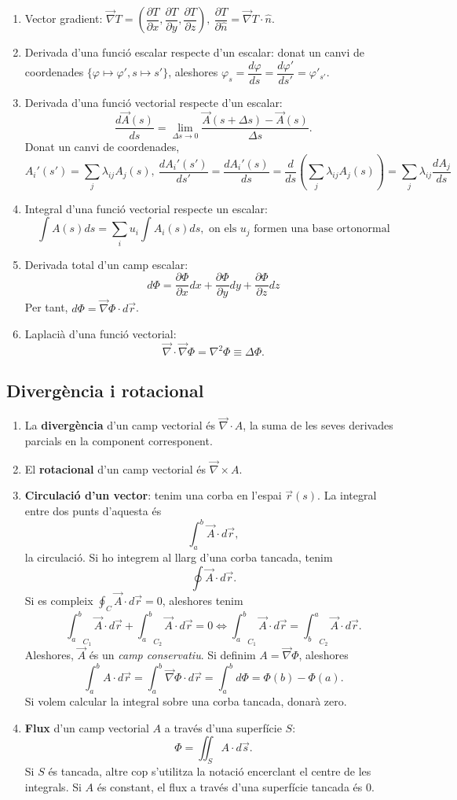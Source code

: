\begin{enumerate}
	\item Vector gradient: $\vec{\nabla}T=\left(\dfrac{\partial T}{\partial x},\dfrac{\partial T}{\partial y},\dfrac{\partial T}{\partial z}\right),\ \dfrac{\partial T}{\partial\hat{n}}=\vec{\nabla}T\cdot\hat{n}$.
	\item Derivada d'una funció escalar respecte d'un escalar: donat un canvi de coordenades $\{\varphi\mapsto\varphi',s\mapsto s'\}$, aleshores $\varphi_s=\dfrac{d\varphi}{ds}=\dfrac{d\varphi'}{ds'}=\varphi'_{s'}$.
	\item Derivada d'una funció vectorial respecte d'un escalar: \[\dfrac{d\vec{A}(s)}{ds}=\lim_{\Delta s\rightarrow0}\dfrac{\vec{A}(s+\Delta s)-\vec{A}(s)}{\Delta s}.\] Donat un canvi de coordenades,
	\[
	A_i'(s')=\sum_j\lambda_{ij}A_j(s),\ \dfrac{dA_i'(s')}{ds'}=\dfrac{dA_i'(s)}{ds}=\dfrac{d}{ds}\left(\sum_{j}\lambda_{ij}A_j(s)\right)=\sum_{j}\lambda_{ij}\dfrac{dA_j}{ds}
	\]
	\item Integral d'una funció vectorial respecte un escalar:
	\[\int A(s)ds=\sum_iu_i\int A_i(s)ds,\text{ on els }u_j\text{ formen una base ortonormal}\]
	\item Derivada total d'un camp escalar:
	\[d\Phi=\dfrac{\partial\Phi}{\partial x}dx+\dfrac{\partial\Phi}{\partial y}dy+\dfrac{\partial\Phi}{\partial z}dz\]
	Per tant, $d\Phi=\vec{\nabla}\Phi\cdot d\vec{r}$.
	\item Laplacià d'una funció vectorial: \[\vec{\nabla}\cdot\vec{\nabla}\Phi=\nabla^2\Phi\equiv\Delta\Phi.\]
\end{enumerate}
\subsection{Divergència i rotacional}
\begin{enumerate}
	\item La \textbf{divergència} d'un camp vectorial és $\vec{\nabla}\cdot A$, la suma de les seves derivades parcials en la component corresponent.
	\item El \textbf{rotacional} d'un camp vectorial és $\vec{\nabla}\times A$.
	\item \textbf{Circulació d'un vector}: tenim una corba en l'espai $\vec{r}(s)$. La integral entre dos punts d'aquesta és \[\int_a^b\vec{A}\cdot d\vec{r},\] la circulació. Si ho integrem al llarg d'una corba tancada, tenim \[\oint\vec{A}\cdot d\vec{r}.\]
	Si es compleix $\oint_C\vec{A}\cdot d\vec{r}=0$, aleshores tenim \[{\int_a^b}_{C_1}\vec{A}\cdot d\vec{r}+{\int_a^b}_{C_2}\vec{A}\cdot d\vec{r}=0\iff{\int_a^b}_{C_1}\vec{A}\cdot d\vec{r}={\int_b^a}_{C_2}\vec{A}\cdot d\vec{r}.\] Aleshores, $\vec{A}$ és un \textit{camp conservatiu}. Si definim $A=\vec{\nabla}\Phi$, aleshores \[\int_a^bA\cdot d\vec{r}=\int_a^b\vec{\nabla}\Phi\cdot d\vec{r}=\int_a^bd\Phi=\Phi(b)-\Phi(a).\] Si volem calcular la integral sobre una corba tancada, donarà zero.
	\item \textbf{Flux} d'un camp vectorial $A$ a través d'una superfície $S$: \[\Phi=\iint_SA\cdot d\vec{s}.\] Si $S$ és tancada, altre cop s'utilitza la notació encerclant el centre de les integrals. Si $A$ és constant, el flux a través d'una superfície tancada és 0.
\end{enumerate}

